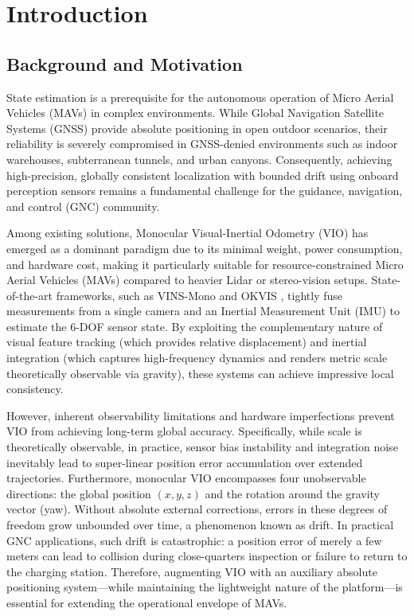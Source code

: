 \documentclass{svproc}
\begin{document}
\section{Introduction}

\subsection{Background and Motivation}

State estimation is a prerequisite for the autonomous operation of Micro Aerial Vehicles (MAVs) in complex environments. While Global Navigation Satellite Systems (GNSS) provide absolute positioning in open outdoor scenarios, their reliability is severely compromised in GNSS-denied environments such as indoor warehouses, subterranean tunnels, and urban canyons. Consequently, achieving high-precision, globally consistent localization with bounded drift using onboard perception sensors remains a fundamental challenge for the guidance, navigation, and control (GNC) community.

Among existing solutions, Monocular Visual-Inertial Odometry (VIO) has emerged as a dominant paradigm due to its minimal weight, power consumption, and hardware cost, making it particularly suitable for resource-constrained Micro Aerial Vehicles (MAVs) compared to heavier Lidar or stereo-vision setups. State-of-the-art frameworks, such as VINS-Mono \cite{qn2018vins} and OKVIS \cite{leutenegger2015keyframe}, tightly fuse measurements from a single camera and an Inertial Measurement Unit (IMU) to estimate the 6-DOF sensor state. By exploiting the complementary nature of visual feature tracking (which provides relative displacement) and inertial integration (which captures high-frequency dynamics and renders metric scale theoretically observable via gravity), these systems can achieve impressive local consistency.

However, inherent observability limitations and hardware imperfections prevent VIO from achieving long-term global accuracy. Specifically, while scale is theoretically observable, in practice, sensor bias instability and integration noise inevitably lead to super-linear position error accumulation over extended trajectories. Furthermore, monocular VIO encompasses four unobservable directions: the global position $(x, y, z)$ and the rotation around the gravity vector (yaw). Without absolute external corrections, errors in these degrees of freedom grow unbounded over time, a phenomenon known as drift. In practical GNC applications, such drift is catastrophic: a position error of merely a few meters can lead to collision during close-quarters inspection or failure to return to the charging station. Therefore, augmenting VIO with an auxiliary absolute positioning system—while maintaining the lightweight nature of the platform—is essential for extending the operational envelope of MAVs.
\end{document}
